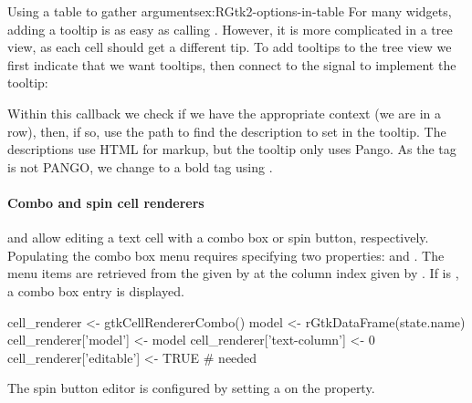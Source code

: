\begin{example}{Using a table to gather arguments}{ex:RGtk2-options-in-table}
For many widgets, adding a
tooltip is as easy as calling
. However, it is more complicated in
a tree view, as each cell should get a different tip.  To add tooltips
to the tree view we first indicate that we want tooltips, then connect
to the  signal to implement the tooltip:
\begin{Schunk}
\end{Schunk}
%
Within this callback we check if we have the appropriate context (we
are in a row), then, if so, use the path to find the description to
set in the tooltip. The descriptions use HTML for markup, but the
tooltip only uses Pango. As the  tag is not PANGO, we
change to a bold tag using .
\end{example}



\paragraph{Combo and spin cell renderers}

 and  allow
editing a text cell with a combo box or spin button,
respectively. Populating the combo box menu requires specifying two
properties:  and . The menu items are
retrieved from the  given by  at the
column index given by .  If  is
, a combo box entry is displayed.
\begin{Schunk}
\begin{Sinput}
 cell_renderer <- gtkCellRendererCombo()
 model <- rGtkDataFrame(state.name)
 cell_renderer['model'] <- model
 cell_renderer['text-column'] <- 0
 cell_renderer['editable'] <- TRUE                  # needed
\end{Sinput}
\end{Schunk}
%
The spin button editor is configured by setting a
 on the  property.


